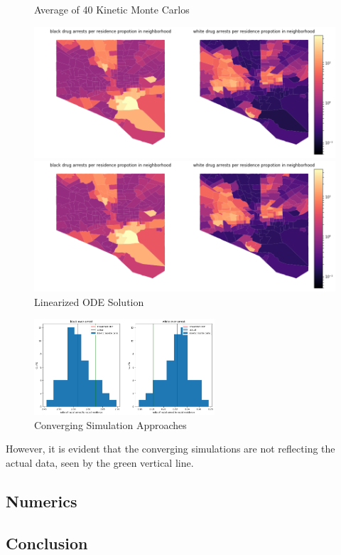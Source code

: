 \documentclass[10pt]{article}
\begin{document}
 \begin{figure}[!htb]
 \begin{minipage}{0.5\textwidth}
     \caption{Average of 40 Kinetic Monte Carlos}
     \centering
     \includegraphics[width=\textwidth]{km.png}
   \end{minipage}\hfill
   \begin{minipage}{0.5\textwidth}
     \caption{Linearized ODE Solution}
     \centering
     \includegraphics[width=\textwidth]{rk.png}
   \end{minipage}\hfill
 \end{figure}
 
    \begin{figure}[!htb]
    \begin{minipage}{\textwidth}
     \caption{Converging Simulation Approaches}
     \centering
     \includegraphics[width=0.6\textwidth]{kmandrk.png}
   \end{minipage}\hfill
 \end{figure}
 
 However, it is evident that the converging simulations are not reflecting the actual data, seen by the green vertical line. 
\subsection*{Numerics}

\subsection*{Conclusion}
 
 
\end{document}

